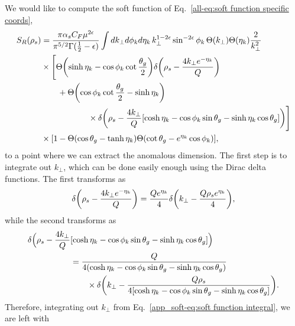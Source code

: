 \documentclass[../thesis.tex]{subfiles}
\begin{document}
	We would like to compute the soft function of Eq.~\ref{all-eq:soft function specific coords},
	\begin{equation}\label{app_soft-eq:soft function integral}
	\begin{aligned}
		S_R(\rho_s) &= \frac{\pi \alpha_s C_F \mu^{2\epsilon}}{\pi^{5/2} \Gamma(\frac{1}{2} - \epsilon)} \int dk_\perp d\phi_k d\eta_k \,k_\perp^{1 - 2\epsilon} \sin^{-2\epsilon} \phi_k \, \Theta(k_\perp)\Theta(\eta_k) \frac{2}{k_\perp^2} \\
		&\times \Bigg[ \Theta\qty(\sinh\eta_k - \cos\phi_k \cot\frac{\theta_g}{2}) \delta\qty(\rho_s - \frac{4k_\perp e^{-\eta_k}}{Q}) \\
		&\qquad+ \Theta\qty(\cos\phi_k \cot\frac{\theta_g}{2} - \sinh\eta_k) \\
		&\hspace{2cm}\times \delta\qty(\rho_s - \frac{4k_\perp}{Q}\qty[\cosh\eta_k - \cos\phi_k \sin\theta_g - \sinh\eta_k \cos\theta_g]) \Bigg] \\
		&\times \qty[1 - \Theta(\cos\theta_g - \tanh \eta_k)\Theta(\cot\theta_g - e^{\eta_k}\cos\phi_k)],
	\end{aligned}
	\end{equation}
	to a point where we can extract the anomalous dimension. The first step is to integrate out $k_\perp$, which can be done easily enough using the Dirac delta functions. The first transforms as
	\begin{equation}
		\delta\qty(\rho_s - \frac{4k_\perp e^{-\eta_k}}{Q}) = \frac{Q e^{\eta_k}}{4} \delta\qty(k_\perp - \frac{Q \rho_s e^{\eta_k}}{4}),
	\end{equation}
	while the second transforms as
	\begin{equation}
	\begin{aligned}
		\delta\Big(\rho_s - \frac{4 k_\perp}{Q}&\qty[\cosh\eta_k - \cos\phi_k\sin\theta_g - \sinh\eta_k\cos\theta_g]\Big) \\
		&= \frac{Q}{4\qty(\cosh\eta_k - \cos\phi_k\sin\theta_g - \sinh\eta_k\cos\theta_g)} \\
		&\qquad\times\delta\qty(k_\perp - \frac{Q \rho_s}{4\qty[\cosh\eta_k - \cos\phi_k\sin\theta_g - \sinh\eta_k\cos\theta_g]}).
	\end{aligned}
	\end{equation}
	Therefore, integrating out $k_\perp$ from Eq.~\ref{app_soft-eq:soft function integral}, we are left with
\end{document}
